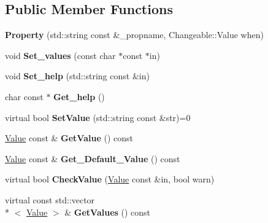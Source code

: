 \subsection*{Public Member Functions}
\begin{DoxyCompactItemize}
\item 
\hypertarget{classProperty_ab65733010b8ea50392b4ea43536c0008}{{\bfseries Property} (std\-::string const \&\-\_\-propname, Changeable\-::\-Value when)}\label{classProperty_ab65733010b8ea50392b4ea43536c0008}

\item 
\hypertarget{classProperty_ae192c83aeb5086ca074c4daa85007de2}{void {\bfseries Set\-\_\-values} (const char $\ast$const $\ast$in)}\label{classProperty_ae192c83aeb5086ca074c4daa85007de2}

\item 
\hypertarget{classProperty_ab3b3960401fd26c83add4c223809d534}{void {\bfseries Set\-\_\-help} (std\-::string const \&in)}\label{classProperty_ab3b3960401fd26c83add4c223809d534}

\item 
\hypertarget{classProperty_a83a01588ef9bc4b9e3cd5faf57649013}{char const $\ast$ {\bfseries Get\-\_\-help} ()}\label{classProperty_a83a01588ef9bc4b9e3cd5faf57649013}

\item 
\hypertarget{classProperty_ab36313503e43bc6c1294c23d5dba323f}{virtual bool {\bfseries Set\-Value} (std\-::string const \&str)=0}\label{classProperty_ab36313503e43bc6c1294c23d5dba323f}

\item 
\hypertarget{classProperty_a8972c72f3a4d10e20782cb7dc7800bea}{\hyperlink{classValue}{Value} const \& {\bfseries Get\-Value} () const }\label{classProperty_a8972c72f3a4d10e20782cb7dc7800bea}

\item 
\hypertarget{classProperty_a665dc0efff99aa4e29162bf87b287f9b}{\hyperlink{classValue}{Value} const \& {\bfseries Get\-\_\-\-Default\-\_\-\-Value} () const }\label{classProperty_a665dc0efff99aa4e29162bf87b287f9b}

\item 
\hypertarget{classProperty_a916d05a8fb70701e54d391d737d19209}{virtual bool {\bfseries Check\-Value} (\hyperlink{classValue}{Value} const \&in, bool warn)}\label{classProperty_a916d05a8fb70701e54d391d737d19209}

\item 
\hypertarget{classProperty_a075dc0610fe9aba50a50ce8f099c0751}{virtual const std\-::vector\\*
$<$ \hyperlink{classValue}{Value} $>$ \& {\bfseries Get\-Values} () const }\label{classProperty_a075dc0610fe9aba50a50ce8f099c0751}


\end{DoxyCompactItemize}
